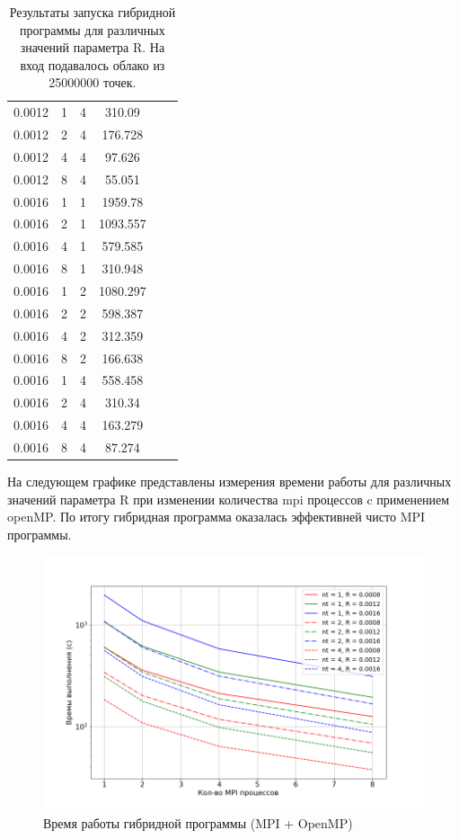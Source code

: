 \begin{table}[h]
\begin{tabular}{|c|c|c|c|c|c|}
    \hline
    0.0012 &  1  & 4  &  310.09 \\
    0.0012 &  2  & 4  &  176.728 \\
    0.0012 &  4  & 4  &  97.626 \\
    0.0012 &  8  & 4  &  55.051 \\
    \hline\hline
    0.0016 &  1  & 1  &  1959.78 \\
    0.0016 &  2  & 1  &  1093.557 \\
    0.0016 &  4  & 1  &  579.585 \\
    0.0016 &  8  & 1  &  310.948 \\
    \hline
    0.0016 &  1  & 2  &  1080.297 \\
    0.0016 &  2  & 2  &  598.387 \\
    0.0016 &  4  & 2  &  312.359 \\
    0.0016 &  8  & 2  &  166.638 \\
    \hline
    0.0016 &  1  & 4  &  558.458 \\
    0.0016 &  2  & 4  &  310.34 \\
    0.0016 &  4  & 4  &  163.279 \\
    0.0016 &  8  & 4  &  87.274 \\
    
    \hline
\end{tabular}
\caption{Результаты запуска гибридной программы для различных значений параметра R. На вход подавалось облако из 25000000 точек.}
\label{table:1}
\end{table}

\clearpage
На следующем графике представлены измерения времени работы для различных значений параметра R при изменении количества mpi процессов c применением openMP. По итогу гибридная программа оказалась эффективней чисто MPI программы.

\begin{figure}[h]
    \centering
    \includegraphics[scale=0.6]{images/time_1_omp.png}
    \caption{Время работы гибридной программы (MPI + OpenMP)}
    \label{fig:mesh1}
\end{figure}

